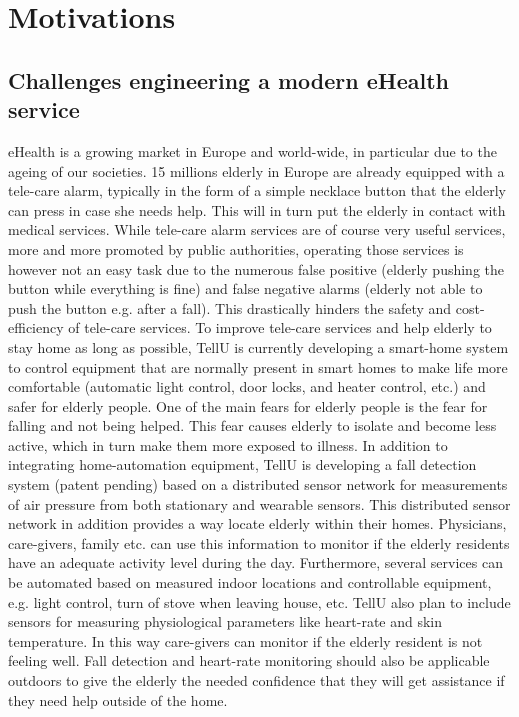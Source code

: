 \section{Motivations}
\subsection{Challenges engineering a modern eHealth service}

eHealth is a growing market in Europe and world-wide, in particular due to the ageing of our societies. 15 millions elderly in Europe are already equipped with a tele-care alarm, typically in the form of a simple necklace button that the elderly can press in case she needs help. This will in turn put the elderly in contact with medical services. While tele-care alarm services are of course very useful services, more and more promoted by public authorities, operating those services is however not an easy task due to the numerous false positive (elderly pushing the button while everything is fine) and false negative alarms (elderly not able to push the button e.g. after a fall). This drastically hinders the safety and cost-efficiency of tele-care services. 
To improve tele-care services and help elderly to stay home as long as possible, TellU is currently developing a smart-home system to control equipment that are normally present in smart homes to make life more comfortable (automatic light control, door locks, and heater control, etc.) and safer for elderly people. One of the main fears for elderly people is the fear for falling and not being helped. This fear causes elderly to isolate and become less active, which in turn make them more exposed to illness. In addition to integrating home-automation equipment, TellU is developing a fall detection system (patent pending) based on a distributed sensor network for measurements of air pressure from both stationary and wearable sensors. This distributed sensor network in addition provides a way locate elderly within their homes. Physicians, care-givers, family etc. can use this information to monitor if the elderly residents have an adequate activity level during the day. Furthermore, several services can be automated based on measured indoor locations and controllable equipment, e.g. light control, turn of stove when leaving house, etc. TellU also plan to include sensors for measuring physiological parameters like heart-rate and skin temperature. In this way care-givers can monitor if the elderly resident is not feeling well. Fall detection and heart-rate monitoring should also be applicable outdoors to give the elderly the needed confidence that they will get assistance if they need help outside of the home. 

